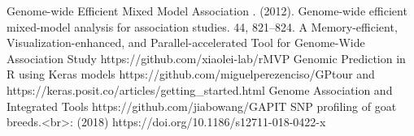 \markdownRendererUlItem {} Genome-wide Efficient Mixed Model Association .  (2012). Genome-wide efficient mixed-model analysis for association studies.  44, 821–824.\markdownRendererUlItemEnd 
\markdownRendererUlItem {} A Memory-efficient, Visualization-enhanced, and Parallel-accelerated Tool for Genome-Wide Association Study https://github.com/xiaolei-lab/rMVP\markdownRendererUlItemEnd 
\markdownRendererUlItem {} Genomic Prediction in R using Keras models https://github.com/miguelperezenciso/GPtour and https://keras.posit.co/articles/getting_started.html\markdownRendererUlItemEnd 
\markdownRendererUlItem {} Genome Association and Integrated Tools https://github.com/jiabowang/GAPIT\markdownRendererUlItemEnd 
\markdownRendererUlEnd \markdownRendererInterblockSeparator
{}
\markdownRendererSectionEnd \markdownRendererSectionBegin
{}\markdownRendererInterblockSeparator
{}\markdownRendererOlBeginTight
{}SNP profiling of goat breeds.<br>:  (2018) https://doi.org/10.1186/s12711-018-0422-x\markdownRendererOlItemEnd 
\markdownRendererOlEndTight \markdownRendererInterblockSeparator
{}\markdownRendererInterblockSeparator
{}\markdownRendererInterblockSeparator

